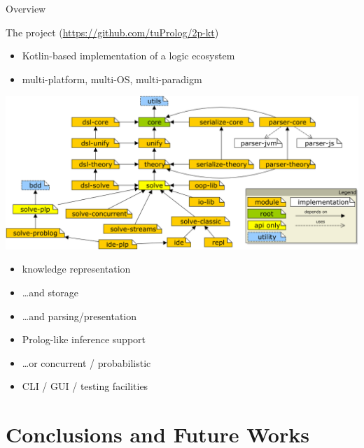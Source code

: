 \documentclass[presentation]{beamer}\mode<presentation>{\usetheme{AMSBolognaFC}}
\begin{document}
\begin{frame}{Overview}
    \begin{block}{The \twopkt{} project \hfill (\url{https://github.com/tuProlog/2p-kt})}
        \begin{itemize}
            \item Kotlin-based implementation of a logic ecosystem
            \item multi-platform, multi-OS, multi-paradigm
        \end{itemize}
    \end{block} 

    \begin{center}
        \includegraphics[width=.7\linewidth]{figures/project-map.png}    
    \end{center}

    \begin{multicols}{2}
        \begin{itemize}\small
            \item knowledge representation
            
            \item \ldots and storage
            
            \item \ldots and parsing/presentation

            \item Prolog-like inference support
            \item \ldots or concurrent / probabilistic
            
            \item CLI / GUI / testing facilities
        \end{itemize}
    \end{multicols}
\end{frame}

\section{Conclusions and Future Works}
\end{document}
